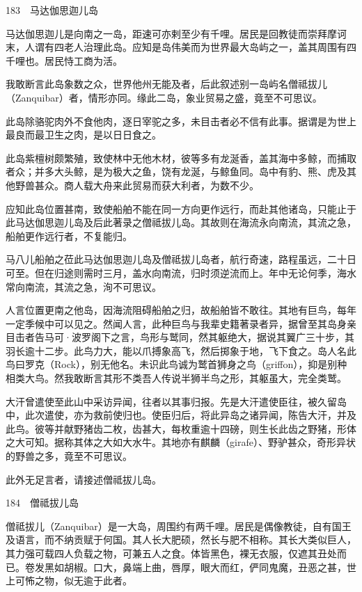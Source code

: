 \documentclass[12pt,UTF8]{ctexbook}
\begin{document}
183　马达伽思迦儿岛

马达伽思迦儿是向南之一岛，距速可亦剌至少有千哩。居民是回教徒而崇拜摩诃末，人谓有四老人治理此岛。应知是岛伟美而为世界最大岛屿之一，盖其周围有四千哩也。居民恃工商为活。

我敢断言此岛象数之众，世界他州无能及者，后此叙述别一岛屿名僧祗拔儿（Zanquibar）者，情形亦同。缘此二岛，象业贸易之盛，竟至不可思议。

此岛除骆驼肉外不食他肉，逐日宰驼之多，未目击者必不信有此事。据谓是为世上最良而最卫生之肉，是以日日食之。

此岛紫檀树颇繁殖，致使林中无他木材，彼等多有龙涎香，盖其海中多鲸，而捕取者众；并多大头鲸，是为极大之鱼，饶有龙涎，与鲸鱼同。岛中有豹、熊、虎及其他野兽甚众。商人载大舟来此贸易而获大利者，为数不少。

应知此岛位置甚南，致使船舶不能在同一方向更作远行，而赴其他诸岛，只能止于此马达伽思迦儿岛及后此著录之僧祗拔儿岛。其故则在海流永向南流，其流之急，船舶更作远行者，不复能归。

马八儿船舶之莅此马达伽思迦儿岛及僧祗拔儿岛者，航行奇速，路程虽远，二十日可至。但在归途则需时三月，盖水向南流，归时须逆流而上。年中无论何季，海水常向南流，其流之急，洵不可思议。

人言位置更南之他岛，因海流阻碍船舶之归，故船舶皆不敢往。其地有巨鸟，每年一定季候中可以见之。然闻人言，此种巨鸟与我辈史籍著录者异，据曾至其岛身亲目击者告马可·波罗阁下之言，鸟形与鹫同，然其躯绝大，据说其翼广三十步，其羽长逾十二步。此鸟力大，能以爪搏象高飞，然后掷象于地，飞下食之。岛人名此鸟曰罗克（Rock），别无他名。未识此鸟诚为鹫首狮身之鸟（griffon），抑是别种相类大鸟。然我敢断言其形不类吾人传说半狮半鸟之形，其躯虽大，完全类鹫。

大汗曾遣使至此山中采访异闻，往者以其事归报。先是大汗遣使臣往，被久留岛中，此次遣使，亦为救前使归也。使臣归后，将此异岛之诸异闻，陈告大汗，并及此鸟。彼等并献野猪齿二枚，齿甚大，每枚重逾十四磅，则生长此齿之野猪，形体之大可知。据称其体之大如大水牛。其地亦有麒麟（girafe）、野驴甚众，奇形异状的野兽之多，竟至不可思议。

此外无足言者，请接述僧祗拔儿岛。





184　僧祗拔儿岛

僧祗拔儿（Zanquibar）是一大岛，周围约有两千哩。居民是偶像教徒，自有国王及语言，而不纳贡赋于何国。其人长大肥硕，然长与肥不相称。其长大类似巨人，其力强可载四人负载之物，可兼五人之食。体皆黑色，裸无衣服，仅遮其丑处而已。卷发黑如胡椒。口大，鼻端上曲，唇厚，眼大而红，俨同鬼魔，丑恶之甚，世上可怖之物，似无逾于此者。
\end{document}
